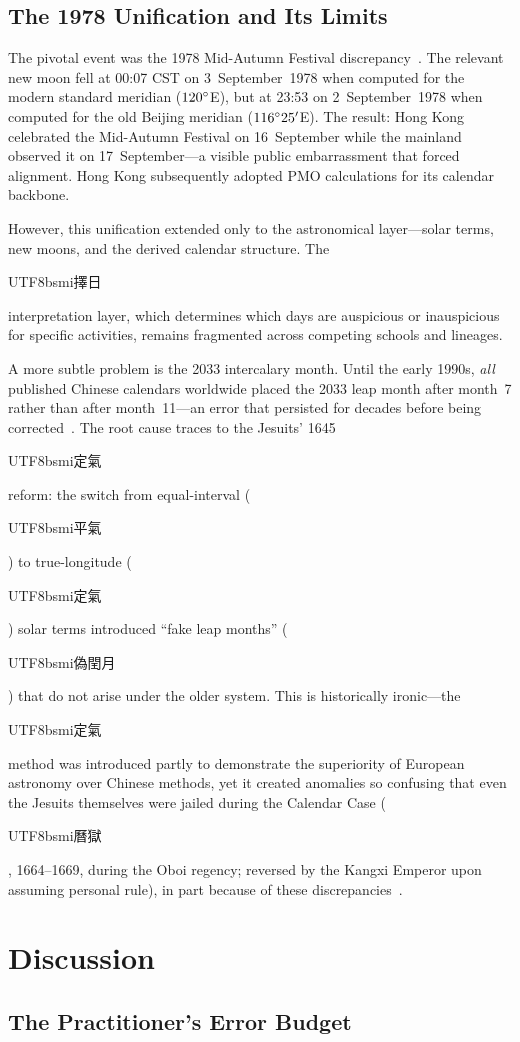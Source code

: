 \documentclass[10pt,a4paper]{article}
\newcommand{\zh}[1]{\begin{CJK}{UTF8}{bsmi}#1\end{CJK}}
\begin{document}
\subsection{The 1978 Unification and Its Limits}
\label{subsec:unification1978}

The pivotal event was the 1978 Mid-Autumn Festival discrepancy~\cite{ytliu_rules}.
The relevant new moon fell at 00:07 CST on 3~September~1978 when computed for
the modern standard meridian ($120\degree$E), but at 23:53 on
2~September~1978 when computed for the old Beijing meridian
($116\degree 25'$E).  The result: Hong Kong celebrated the Mid-Autumn
Festival on 16~September while the mainland observed it on 17~September---a
visible public embarrassment that forced alignment.  Hong Kong subsequently
adopted PMO calculations for its calendar backbone.

However, this unification extended only to the astronomical
layer---solar terms, new moons, and the derived calendar structure.  The
\zh{擇日} interpretation layer, which determines which days are auspicious
or inauspicious for specific activities, remains fragmented across competing
schools and lineages.

A more subtle problem is the 2033 intercalary month.  Until the early
1990s, \emph{all} published Chinese calendars worldwide placed the 2033
leap month after month~7 rather than after month~11---an error that
persisted for decades before being
corrected~\cite{aslaksen_fake, wikipedia_2033}.  The root cause traces to
the Jesuits' 1645 \zh{定氣} reform: the switch from equal-interval
(\zh{平氣}) to true-longitude (\zh{定氣}) solar terms introduced
``fake leap months'' (\zh{偽閏月}) that do not arise under the older
system.  This is historically ironic---the \zh{定氣} method was introduced
partly to demonstrate the superiority of European astronomy over Chinese
methods, yet it created anomalies so confusing that even the Jesuits
themselves were jailed during the Calendar Case (\zh{曆獄}, 1664--1669, during the Oboi regency;
reversed by the Kangxi Emperor upon assuming personal rule), in
part because of these discrepancies~\cite{sivin2009, udias1994}.

\section{Discussion}
\label{sec:discussion}

\subsection{The Practitioner's Error Budget}
\end{document}

